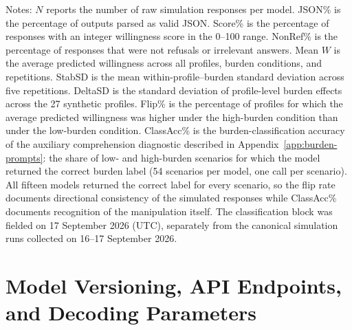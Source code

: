 \begin{table}[htbp]
\begin{flushleft}
\footnotesize Notes: $N$ reports the number of raw simulation responses per model. JSON\% is the percentage of outputs parsed as valid JSON. Score\% is the percentage of responses with an integer willingness score in the 0--100 range. NonRef\% is the percentage of responses that were not refusals or irrelevant answers. Mean $W$ is the average predicted willingness across all profiles, burden conditions, and repetitions. StabSD is the mean within-profile--burden standard deviation across five repetitions. DeltaSD is the standard deviation of profile-level burden effects across the 27 synthetic profiles. Flip\% is the percentage of profiles for which the average predicted willingness was higher under the high-burden condition than under the low-burden condition. ClassAcc\% is the burden-classification accuracy of the auxiliary comprehension diagnostic described in Appendix~\ref{app:burden-prompts}: the share of low- and high-burden scenarios for which the model returned the correct burden label (54 scenarios per model, one call per scenario). All fifteen models returned the correct label for every scenario, so the flip rate documents directional consistency of the simulated responses while ClassAcc\% documents recognition of the manipulation itself. The classification block was fielded on 17 September 2026 (UTC), separately from the canonical simulation runs collected on 16--17 September 2026.
\end{flushleft}
\end{table}

\clearpage   %

\clearpage   %
\section{Model Versioning, API Endpoints, and Decoding Parameters}
\label{app:models}

